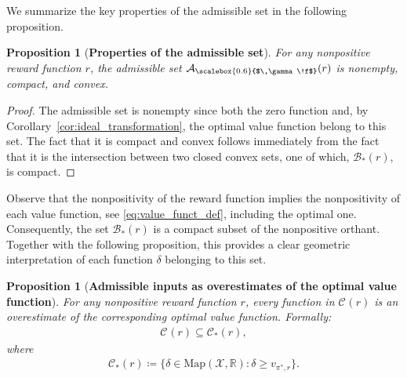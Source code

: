 \documentclass[10pt,leqno]{amsart}
\newcommand{\R}{\mathbb{R}}
\newcommand{\X}{\mathcal{X}}
\newcommand{\cost}{r}
\newcommand{\vvarg}[1]{v_{#1}}
\newcommand{\f}{f}
\newcommand{\policy}{\pi}
\newcommand{\disc}{\gamma}
\newcommand{\advset}[2]{\mathcal{C}_{#1}(#2)}
\newcommand{\feasset}[1]{\mathcal{A}_{\scalebox{0.6}{$\,\disc\!\f$}}(#1)}
\newcommand{\maps}{\text{Map}}
\newtheorem{proposition}[theorem]{Proposition}
\begin{document}
\noindent We summarize the key properties of the admissible set in the following proposition.
\begin{proposition}[\textbf{Properties of the admissible set}]\label{prop:properties_feasible_set}
    For any nonpositive reward function $\cost$, the admissible set $\feasset{\cost}$ is nonempty, compact, and convex.
\end{proposition}
\begin{proof}
    The admissible set is nonempty since both the zero function and, by Corollary~\ref{cor:ideal_transformation}, the optimal value function belong to this set. The fact that it is compact and convex follows immediately from the fact that it is the intersection between two closed convex sets, one of which, $\mathcal{B}_*(\cost)$, is compact. 
\end{proof}
\noindent
Observe that the nonpositivity of the reward function implies the nonpositivity of each value function, see \eqref{eq:value_funct_def}, including the optimal one. Consequently, the set $\mathcal{B}_*(\cost)$ is a compact subset of the nonpositive orthant. Together with the following proposition, this provides a clear geometric interpretation of each function $\delta$ belonging to this set.
\begin{proposition}[\textbf{Admissible inputs as overestimates of the optimal value function}]\label{prop:feas_set_as_overestimates}
    For any nonpositive reward function $\cost$, every function in $\advset{}{\cost}$ is an overestimate of the corresponding optimal value function. Formally:
    \begin{align*}
        \advset{}{\cost} \subseteq \mathcal{C}_*(\cost),
    \end{align*}
    where
    \begin{align}\label{eq:overestimates_set}
        \mathcal{C}_*(\cost) \coloneqq \{\delta \in \maps(\X, \R) : \delta \geq \vvarg{\policy^*\!, \cost}\}.
    \end{align}
\end{proposition}
\end{document}
